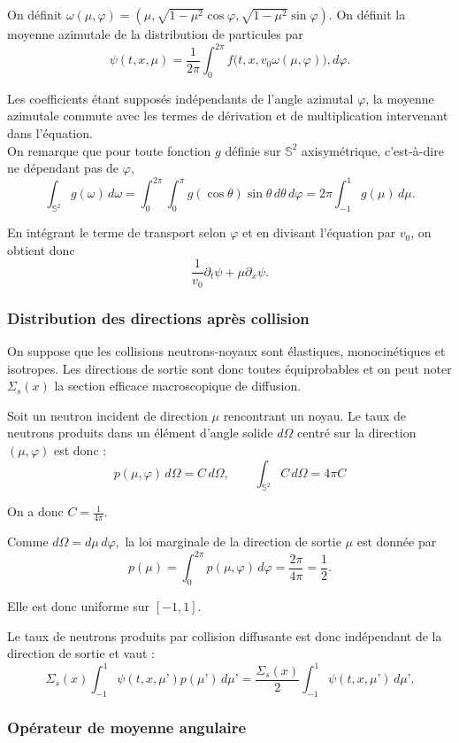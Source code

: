\documentclass{article}
\begin{document}
On définit \(\omega(\mu,\varphi) = \left(\mu,\sqrt{1-\mu^2}\cos\varphi,\sqrt{1-\mu^2}\sin\varphi\right).\) On définit la moyenne azimutale de la distribution de particules par
\[
\psi(t,x,\mu) = \frac{1}{2\pi} \int_0^{2\pi} f\bigl(t,x,v_0\omega(\mu,\varphi)\bigr),d\varphi.
\]

Les coefficients étant supposés indépendants de l'angle azimutal $\varphi$, la moyenne azimutale commute avec les termes de dérivation et de multiplication intervenant dans l'équation.\\

On remarque que pour toute fonction $g$ définie sur $\mathbb{S}^2$ axisymétrique, c’est-à-dire ne dépendant pas de $\varphi$,
\[
\int_{\mathbb{S}^2}g(\omega)\,d\omega = \int_0^{2\pi}\int_0^\pi
g(\cos\theta)\sin\theta\,d\theta\,d\varphi
=2\pi\int_{-1}^1g(\mu)\,d\mu.
\]

En intégrant le terme de transport selon $\varphi$ et en divisant l’équation par $v_0$, on obtient donc
\[
\frac{1}{v_0}\partial_t\psi+\mu\partial_x\psi.
\]

\subsubsection{Distribution des directions après collision}

On suppose que les collisions neutrons-noyaux sont élastiques, monocinétiques et isotropes. Les directions de sortie sont donc toutes équiprobables et on peut noter $\Sigma_s(x)$ la section efficace macroscopique de diffusion.

Soit un neutron incident de direction \(\mu\) rencontrant un noyau. Le taux de neutrons produits dans un élément d’angle solide $d\Omega$ centré sur la direction \((\mu,\varphi)\) est donc :
\[
p(\mu,\varphi)\,d\Omega =C\,d\Omega,
\qquad
\int_{\mathbb{S}^2}C\,d\Omega = 4\pi C
\]

On a donc \( C=\frac{1}{4\pi}.\)

Comme \(d\Omega=d\mu\,d\varphi, \) la loi marginale de la direction de sortie $\mu$ est donnée par
\[
p(\mu)=\int_0^{2\pi} p(\mu,\varphi)\,d\varphi =\frac{2\pi}{4\pi} =\frac12.
\]

Elle est donc uniforme sur $[-1,1]$.

Le taux de neutrons produits par collision diffusante est donc indépendant de la direction de sortie et vaut :
\[
\Sigma_s(x)
\int_{-1}^1
\psi(t,x,\mu’)p(\mu’)\,d\mu’
=\frac{\Sigma_s(x)}{2}
\int_{-1}^1
\psi(t,x,\mu’)\,d\mu’.
\]

\subsubsection{Opérateur de moyenne angulaire}
\end{document}
